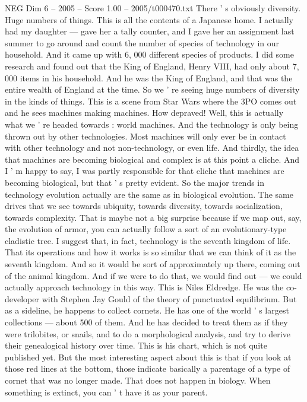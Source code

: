 \begin{textsample}{NEG Dim 6 – 2005 – Score 1.00 – 2005/t000470.txt}
There ' s obviously diversity.
Huge numbers of things.
This is all the contents of a Japanese home.
I actually had my daughter — gave her a tally counter, and I gave her an assignment last summer to go around and count the number of species of technology in our household.
And it came up with 6, 000 different species of products.
I did some research and found out that the King of England, Henry VIII, had only about 7, 000 items in his household.
And he was the King of England, and that was the entire wealth of England at the time.
So we ' re seeing huge numbers of diversity in the kinds of things.
This is a scene from Star Wars where the 3PO comes out and he sees machines making machines.
How depraved!
Well, this is actually what we ' re headed towards : world machines.
And the technology is only being thrown out by other technologies.
Most machines will only ever be in contact with other technology and not non-technology, or even life.
And thirdly, the idea that machines are becoming biological and complex is at this point a cliche.
And I ' m happy to say, I was partly responsible for that cliche that machines are becoming biological, but that ' s pretty evident.
So the major trends in technology evolution actually are the same as in biological evolution.
The same drives that we see towards ubiquity, towards diversity, towards socialization, towards complexity.
That is maybe not a big surprise because if we map out, say, the evolution of armor, you can actually follow a sort of an evolutionary-type cladistic tree.
I suggest that, in fact, technology is the seventh kingdom of life.
That its operations and how it works is so similar that we can think of it as the seventh kingdom.
And so it would be sort of approximately up there, coming out of the animal kingdom.
And if we were to do that, we would find out — we could actually approach technology in this way.
This is Niles Eldredge.
He was the co-developer with Stephen Jay Gould of the theory of punctuated equilibrium.
But as a sideline, he happens to collect cornets.
He has one of the world ' s largest collections — about 500 of them.
And he has decided to treat them as if they were trilobites, or snails, and to do a morphological analysis, and try to derive their genealogical history over time.
This is his chart, which is not quite published yet.
But the most interesting aspect about this is that if you look at those red lines at the bottom, those indicate basically a parentage of a type of cornet that was no longer made.
That does not happen in biology.
When something is extinct, you can ' t have it as your parent.

\end{textsample}
